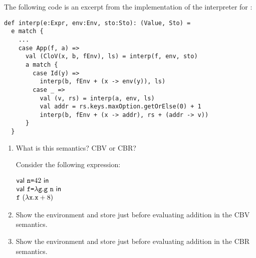 \begin{exercise}

The following code is an excerpt from the implementation of the interpreter for
\lang:
\begin{verbatim}
def interp(e:Expr, env:Env, sto:Sto): (Value, Sto) =
  e match {
    ...
    case App(f, a) =>
      val (CloV(x, b, fEnv), ls) = interp(f, env, sto)
      a match {
        case Id(y) =>
          interp(b, fEnv + (x -> env(y)), ls)
        case _ =>
          val (v, rs) = interp(a, env, ls)
          val addr = rs.keys.maxOption.getOrElse(0) + 1
          interp(b, fEnv + (x -> addr), rs + (addr -> v))
      }
  }
\end{verbatim}

\begin{enumerate}
  \item What is this semantics? CBV or CBR?

Consider the following expression:

$\begin{array}{@{}l}
  \ebind{\code{n}}{42}{ \\
  \ebind{\code{f}}{\efun{\code{g}}{\eapp{\code{g}}{\code{n}}}}{ \\
  \eapp{\code{f}}{(\efun{\cx}{\eadd{\cx}{8}})}}}
\end{array}$

\item Show the environment and store just before evaluating addition in the CBV semantics.
\item Show the environment and store just before evaluating addition in the CBR semantics.
\end{enumerate}

\end{exercise}

